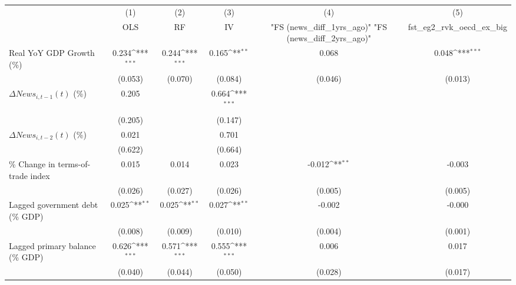 {
\def\sym#1{\ifmmode^{#1}\else\(^{#1}\)\fi}
\begin{tabular}{l*{5}{c}}
\toprule
                    &\multicolumn{1}{c}{(1)}&\multicolumn{1}{c}{(2)}&\multicolumn{1}{c}{(3)}&\multicolumn{1}{c}{(4)}&\multicolumn{1}{c}{(5)}\\
                    &\multicolumn{1}{c}{OLS}&\multicolumn{1}{c}{RF}&\multicolumn{1}{c}{IV}&\multicolumn{1}{c}{ "FS (news_diff_1yrs_ago)"  "FS (news_diff_2yrs_ago)" }&\multicolumn{1}{c}{fst_eg2_rvk_oecd_ex_big}\\
\midrule
Real YoY GDP Growth (\%)&       0.234\sym{***}&       0.244\sym{***}&       0.165\sym{**} &       0.068         &       0.048\sym{***}\\
                    &     (0.053)         &     (0.070)         &     (0.084)         &     (0.046)         &     (0.013)         \\
\addlinespace
$ \Delta News_{i,t-1}(t)$ (\%)&       0.205         &                     &       0.664\sym{***}&                     &                     \\
                    &     (0.205)         &                     &     (0.147)         &                     &                     \\
\addlinespace
$ \Delta News_{i,t-2}(t)$ (\%)&       0.021         &                     &       0.701         &                     &                     \\
                    &     (0.622)         &                     &     (0.664)         &                     &                     \\
\addlinespace
\% Change in terms-of-trade index&       0.015         &       0.014         &       0.023         &      -0.012\sym{**} &      -0.003         \\
                    &     (0.026)         &     (0.027)         &     (0.026)         &     (0.005)         &     (0.005)         \\
\addlinespace
Lagged government debt (\% GDP)&       0.025\sym{**} &       0.025\sym{**} &       0.027\sym{**} &      -0.002         &      -0.000         \\
                    &     (0.008)         &     (0.009)         &     (0.010)         &     (0.004)         &     (0.001)         \\
\addlinespace
Lagged primary balance (\% GDP)&       0.626\sym{***}&       0.571\sym{***}&       0.555\sym{***}&       0.006         &       0.017         \\
                    &     (0.040)         &     (0.044)         &     (0.050)         &     (0.028)         &     (0.017)         \\

\end{tabular}}
